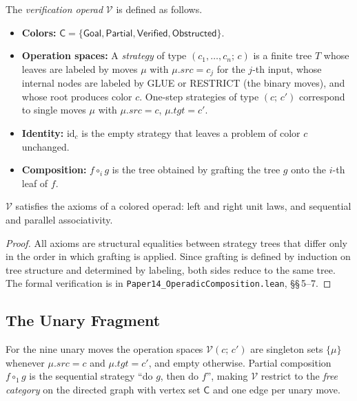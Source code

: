 \documentclass[11pt]{article}
\newcommand{\Vop}{\mathcal{V}}           %
\newcommand{\Ops}[2]{\Vop(#1;\,#2)}      %
\newcommand{\GrColor}{\mathsf{C}}        %
\newcommand{\partialPrf}{\mathsf{Partial}} %
\newcommand{\goalCol}{\mathsf{Goal}}      %
\newcommand{\verifCol}{\mathsf{Verified}} %
\newcommand{\obstCol}{\mathsf{Obstructed}}%
\begin{document}
\begin{definition}[Verification operad $\Vop$]\label{def:Vop}
The \emph{verification operad} $\Vop$ is defined as follows.
\begin{itemize}[nosep]
\item \textbf{Colors:}
  $\GrColor = \{\goalCol, \partialPrf, \verifCol, \obstCol\}$.
\item \textbf{Operation spaces:}
  A \emph{strategy} of type $(c_1,\ldots,c_n;\,c)$ is a finite tree $T$
  whose leaves are labeled by moves $\mu$ with $\mu.\mathit{src} = c_j$
  for the $j$-th input, whose internal nodes are labeled by GLUE or
  RESTRICT (the binary moves), and whose root produces color $c$.
  One-step strategies of type $(c;\,c')$ correspond to single moves
  $\mu$ with $\mu.\mathit{src} = c$, $\mu.\mathit{tgt} = c'$.
\item \textbf{Identity:}
  $\mathrm{id}_c$ is the empty strategy that leaves a problem of
  color $c$ unchanged.
\item \textbf{Composition:}
  $f \circ_i g$ is the tree obtained by grafting the tree $g$ onto the
  $i$-th leaf of $f$.
\end{itemize}
\end{definition}

\begin{proposition}\label{prop:operad-axioms}
$\Vop$ satisfies the axioms of a colored operad: left and right unit
laws, and sequential and parallel associativity.
\end{proposition}

\begin{proof}
All axioms are structural equalities between strategy trees that differ
only in the order in which grafting is applied.  Since grafting is
defined by induction on tree structure and determined by labeling, both
sides reduce to the same tree.
The formal verification is in \texttt{Paper14\_OperadicComposition.lean},
\S\S\,5--7.
\end{proof}

\subsection{The Unary Fragment}

For the nine unary moves the operation spaces $\Ops{c}{c'}$ are
singleton sets $\{\mu\}$ whenever $\mu.\mathit{src} = c$ and
$\mu.\mathit{tgt} = c'$, and empty otherwise.
Partial composition $f \circ_1 g$ is the sequential strategy
``do $g$, then do $f$'', making $\Vop$ restrict to the \emph{free
category} on the directed graph with vertex set $\GrColor$ and one
edge per unary move.
\end{document}
